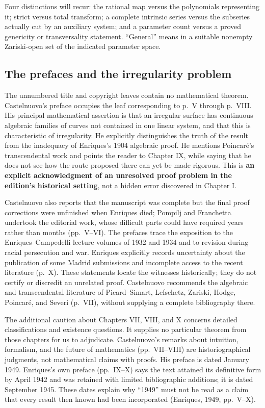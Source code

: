 Four distinctions will recur: the rational map versus the polynomials representing it; strict versus total transform; a complete intrinsic series versus the subseries actually cut by an auxiliary system; and a parameter count versus a proved genericity or transversality statement. ``General'' means in a suitable nonempty Zariski-open set of the indicated parameter space.

\subsection*{The prefaces and the irregularity problem}

The unnumbered title and copyright leaves contain no mathematical theorem. Castelnuovo's preface occupies the leaf corresponding to p.~V through p.~VIII. His principal mathematical assertion is that an irregular surface has continuous algebraic families of curves not contained in one linear system, and that this is characteristic of irregularity. He explicitly distinguishes the truth of the result from the inadequacy of Enriques's 1904 algebraic proof. He mentions Poincaré's transcendental work and points the reader to Chapter IX, while saying that he does not see how the route proposed there can yet be made rigorous. This is \textbf{an explicit acknowledgment of an unresolved proof problem in the edition's historical setting}, not a hidden error discovered in Chapter I.

Castelnuovo also reports that the manuscript was complete but the final proof corrections were unfinished when Enriques died; Pompilj and Franchetta undertook the editorial work, whose difficult parts could have required years rather than months (pp.~V--VI). The prefaces trace the exposition to the Enriques--Campedelli lecture volumes of 1932 and 1934 and to revision during racial persecution and war. Enriques explicitly records uncertainty about the publication of some Madrid submissions and incomplete access to the recent literature (p.~X). These statements locate the witnesses historically; they do not certify or discredit an unrelated proof. Castelnuovo recommends the algebraic and transcendental literature of Picard--Simart, Lefschetz, Zariski, Hodge, Poincaré, and Severi (p.~VII), without supplying a complete bibliography there.

The additional caution about Chapters VII, VIII, and X concerns detailed classifications and existence questions. It supplies no particular theorem from those chapters for us to adjudicate. Castelnuovo's remarks about intuition, formalism, and the future of mathematics (pp.~VII--VIII) are historiographical judgments, not mathematical claims with proofs. His preface is dated January 1949. Enriques's own preface (pp.~IX--X) says the text attained its definitive form by April 1942 and was retained with limited bibliographic additions; it is dated September 1945. These dates explain why ``1949'' must not be read as a claim that every result then known had been incorporated (Enriques, 1949, pp.~V--X).

